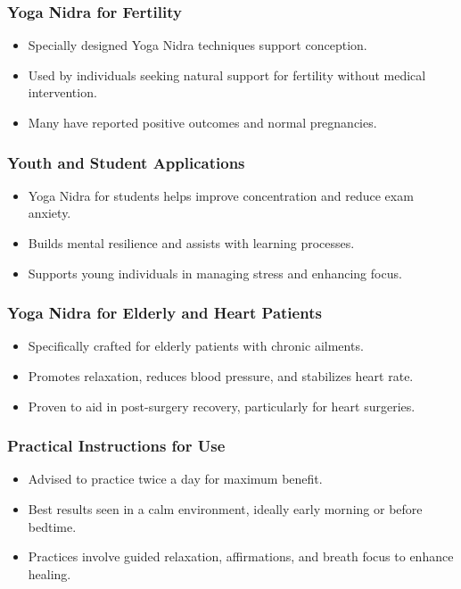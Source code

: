 \begin{frame}[fragile]\frametitle{Yoga Nidra for Fertility}
    \begin{itemize}
        \item Specially designed Yoga Nidra techniques support conception.
        \item Used by individuals seeking natural support for fertility without medical intervention.
        \item Many have reported positive outcomes and normal pregnancies.
    \end{itemize}
\end{frame}

\begin{frame}[fragile]\frametitle{Youth and Student Applications}
    \begin{itemize}
        \item Yoga Nidra for students helps improve concentration and reduce exam anxiety.
        \item Builds mental resilience and assists with learning processes.
        \item Supports young individuals in managing stress and enhancing focus.
    \end{itemize}
\end{frame}

\begin{frame}[fragile]\frametitle{Yoga Nidra for Elderly and Heart Patients}
    \begin{itemize}
        \item Specifically crafted for elderly patients with chronic ailments.
        \item Promotes relaxation, reduces blood pressure, and stabilizes heart rate.
        \item Proven to aid in post-surgery recovery, particularly for heart surgeries.
    \end{itemize}
\end{frame}

\begin{frame}[fragile]\frametitle{Practical Instructions for Use}
    \begin{itemize}
        \item Advised to practice twice a day for maximum benefit.
        \item Best results seen in a calm environment, ideally early morning or before bedtime.
        \item Practices involve guided relaxation, affirmations, and breath focus to enhance healing.
    \end{itemize}
\end{frame}



